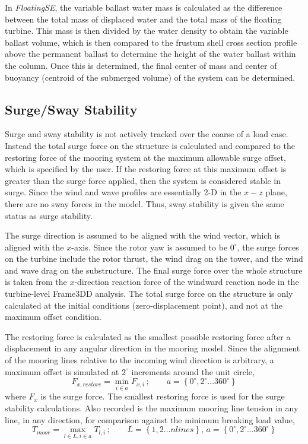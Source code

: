 In \textit{FloatingSE}, the variable ballast water mass is calculated as the
difference between the total mass of displaced water and the total mass
of the floating turbine.  This mass is then divided by the water density
to obtain the variable ballast volume, which is then compared to the
frustum shell cross section profile above the permanent ballast to
determine the height of the water ballast within the column.  Once this
is determined, the final center of mass and center of buoyancy (centroid
of the submerged volume) of the
system can be determined.

\subsection{Surge/Sway Stability}
Surge and sway stability is not actively tracked over the coarse of a
load case.  Instead the total surge force on the structure is calculated
and compared to the restoring force of the mooring system at the maximum
allowable surge offset, which is specified by the user.  If the
restoring force at this maximum offset is greater than the surge force
applied, then the system is considered stable in surge.  Since the wind
and wave profiles are essentially 2-D in the $x-z$ plane, there are no
sway forces in the model.  Thus, sway stability is given the same
status as surge stability.

The surge direction is assumed to be aligned with the wind vector, which
is aligned with the $x$-axis.  Since the rotor yaw is assumed to be
$0^{\circ}$, the surge forces on the turbine include the rotor thrust,
the wind drag on the tower, and the wind and wave drag on the
substructure.  The final surge force over the whole structure is taken
from the $x$-direction reaction force of the windward reaction node in
the turbine-level Frame3DD analysis.  The total surge force on the
structure is only calculated at the initial conditions
(zero-displacement point), and not at the maximum offset condition.

The restoring force is calculated as the smallest possible restoring
force after a displacement in any angular direction in the mooring
model.  Since the alignment of the mooring lines relative to the
incoming wind direction is arbitrary, a maximum offset is simulated at
$2^{\circ}$ increments around the unit circle,
\[
  F_{x,restore} = \min_{i\in a} F_{x,i}\,;\qquad a= \left\{0^{\circ},
    2^{\circ}\ldots 360^{\circ}\right\}
\]
where $F_x$ is the surge force.  The smallest restoring force is used for the surge stability
calculations.  Also recorded is the maximum mooring line tension in any
line, in any direction, for comparison against the minimum breaking load
value,
\[
  T_{moor} = \max_{l\in L,i\in a} T_{l,i}\,;\qquad L=\left\{1,2\ldots
    nlines\right\}, \, a= \left\{0^{\circ}, 2^{\circ}\ldots 360^{\circ}\right\}
\]

